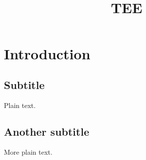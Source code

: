

\graphicspath{{images/}}

\title[]{TEE} 



\maketitle
\thispagestyle{empty}

\section{Introduction}

\subsection{Subtitle}

Plain text.

\subsection{Another subtitle}

More plain text.



